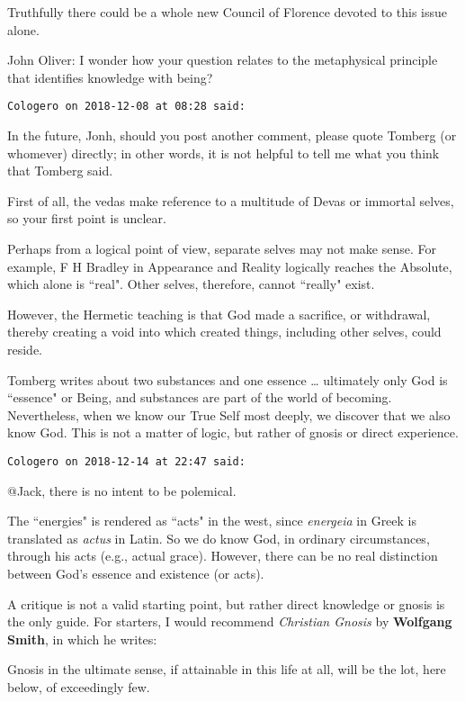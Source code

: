 \begin{footnotesize}
\begin{sffamily}
Truthfully there could be a whole new Council of Florence devoted to this issue alone.

John Oliver: I wonder how your question relates to the metaphysical principle that identifies knowledge with being?


\hfill

\texttt{Cologero on 2018-12-08 at 08:28 said: }

In the future, Jonh, should you post another comment, please quote Tomberg (or whomever) directly; in other words, it is not helpful to tell me what you think that Tomberg said.

First of all, the vedas make reference to a multitude of Devas or immortal selves, so your first point is unclear.

Perhaps from a logical point of view, separate selves may not make sense. For example, F H Bradley in Appearance and Reality logically reaches the Absolute, which alone is ``real". Other selves, therefore, cannot ``really" exist.

However, the Hermetic teaching is that God made a sacrifice, or withdrawal, thereby creating a void into which created things, including other selves, could reside.

Tomberg writes about two substances and one essence … ultimately only God is ``essence" or Being, and substances are part of the world of becoming. Nevertheless, when we know our True Self most deeply, we discover that we also know God. This is not a matter of logic, but rather of gnosis or direct experience.


\hfill

\texttt{Cologero on 2018-12-14 at 22:47 said: }

@Jack, there is no intent to be polemical.

The ``energies" is rendered as ``acts" in the west, since \emph{energeia} in Greek is translated as \emph{actus} in Latin. So we do know God, in ordinary circumstances, through his acts (e.g., actual grace). However, there can be no real distinction between God's essence and existence (or acts).

A critique is not a valid starting point, but rather direct knowledge or gnosis is the only guide. For starters, I would recommend \emph{Christian Gnosis} by \textbf{Wolfgang Smith}, in which he writes:

\begin{quotex}
Gnosis in the ultimate sense, if attainable in this life at all, will be the lot, here below, of exceedingly few.


\end{quotex}
\end{sffamily}
\end{footnotesize}
